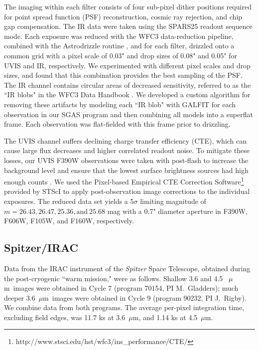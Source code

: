 The imaging within each filter consists of four sub-pixel dither positions required for point spread function (PSF) reconstruction, cosmic ray rejection, and chip gap compensation. The IR data were taken using the SPARS25 readout sequence mode. Each exposure was reduced with the WFC3 data-reduction pipeline, combined with the Astrodrizzle routine \citep{Fruchter:2010lr}, and for each filter, drizzled onto a common grid with a pixel scale of 0.03" and drop sizes of 0.08" and 0.05" for UVIS and IR, respectively. We experimented with different pixel scales and drop sizes, and found that this combination provides the best sampling of the PSF. The IR channel contains circular areas of decreased sensitivity, referred to as the ``IR blobs" in the WFC3 Data Handbook \citep{Deustua:2016ab}. We developed a custom algorithm for removing these artifacts by modeling each ``IR blob" with GALFIT \citep{Peng:2010qy} for each observation in our SGAS program and then combining all models into a superflat frame. Each observation was flat-fielded with this frame prior to drizzling.

The UVIS channel suffers declining charge transfer efficiency (CTE), which can cause large flux decreases and higher correlated readout noise. To mitigate these losses, our UVIS F390W observations were taken with post-flash to increase the background level and ensure that the lowest surface brightness sources had high enough counts \citep{Rajan:2010ab}. We used the Pixel-based Empirical CTE Correction Software\footnote{http://www.stsci.edu/hst/wfc3/ins\_performance/CTE/} provided by STScI to apply post-observation image corrections to the individual exposures. The reduced data set yields a 5$\sigma$ limiting magnitude of $m= 26.43, 26.47, 25.36, \mathrm{and}\ 25.68$ mag with a 0.7" diameter aperture in F390W, F606W, F105W, and F160W, respectively.

\subsection{Spitzer/IRAC}

Data from the IRAC instrument of the {\it Spitzer} Space Telescope, obtained during the post-cryogenic ``warm mission," were as follows.  Shallow 3.6 and 4.5 ~$\mu$m\ images were obtained in Cycle 7 (program 70154, PI M.~Gladders); much deeper 3.6~$\mu$m\ images were obtained in Cycle 9 (program 90232, PI J.~Rigby). We combine data from both programs. The average per-pixel integration time, excluding field edges, was 11.7 ks at 3.6~$\mu$m, and 1.14 ks at 4.5~$\mu$m.


